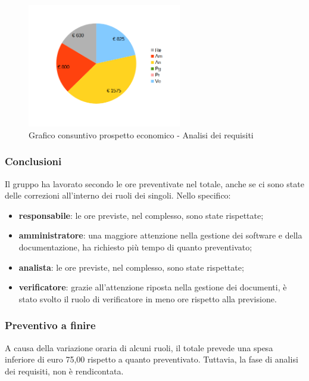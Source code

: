 \begin{figure} [h!]
	\centering
	\includegraphics[width=0.6\textwidth]{res/img/grafici/consuntivo- torta_ costo_per_ora- analisi dei requisiti.png}
	\caption{Grafico consuntivo prospetto economico - Analisi dei requisiti} 
\end{figure}

\newpage 

\subsubsection{Conclusioni}
Il gruppo ha lavorato secondo le ore preventivate nel totale, anche se ci sono state delle correzioni all'interno dei ruoli dei singoli.
Nello specifico:
\begin{itemize}
	\item {\bfseries responsabile}: le ore previste, nel complesso, sono state rispettate;
	\item {\bfseries amministratore}: una maggiore attenzione nella gestione dei software e della documentazione, ha richiesto più tempo di quanto preventivato;
	\item {\bfseries analista}: le ore previste, nel complesso, sono state rispettate;
	\item {\bfseries verificatore}: grazie all'attenzione riposta nella gestione dei documenti, è stato svolto il ruolo di verificatore in meno ore rispetto alla previsione.\\
	
\end{itemize}

	\subsubsection{Preventivo a finire}
	A causa della variazione oraria di alcuni ruoli, il totale prevede una spesa inferiore di euro 75,00 rispetto a quanto preventivato.
	Tuttavia, la fase di analisi dei requisiti, non è rendicontata.
